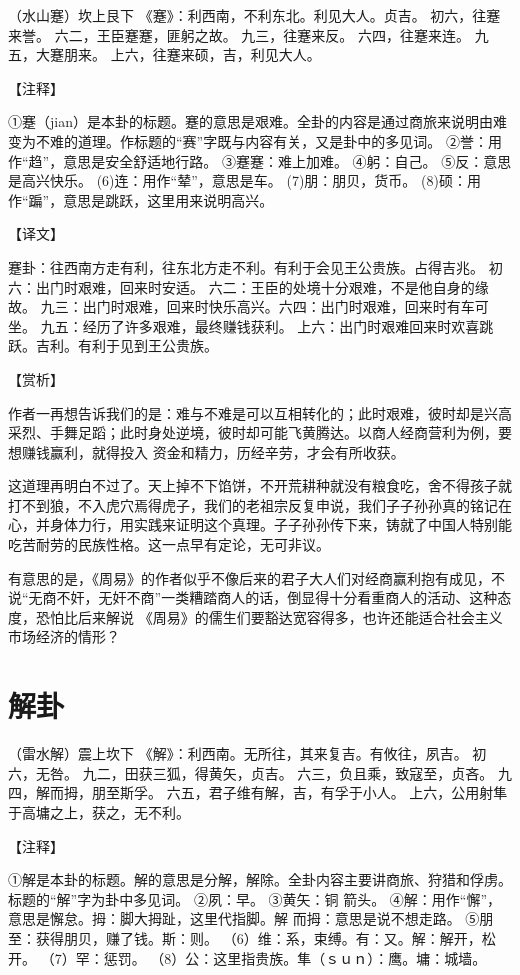 \documentclass[a4paper,12pt,UTF8,twoside]{ctexbook}
\begin{document}
（水山蹇）坎上艮下
《蹇》：利西南，不利东北。利见大人。贞吉。
初六，往蹇来誉。
六二，王臣蹇蹇，匪躬之故。
九三，往蹇来反。
六四，往蹇来连。
九五，大蹇朋来。
上六，往蹇来硕，吉，利见大人。

【注释】

①蹇（jian）是本卦的标题。蹇的意思是艰难。全卦的内容是通过商旅来说明由难变为不难的道理。作标题的“赛”字既与内容有关，又是卦中的多见词。
②誉：用作“趋”，意思是安全舒适地行路。
③蹇蹇：难上加难。
④躬：自己。
⑤反：意思是高兴快乐。
(6)连：用作“辇”，意思是车。
(7)朋：朋贝，货币。
(8)硕：用作“蹁”，意思是跳跃，这里用来说明高兴。

【译文】

蹇卦：往西南方走有利，往东北方走不利。有利于会见王公贵族。占得吉兆。
初六：出门时艰难，回来时安适。
六二：王臣的处境十分艰难，不是他自身的缘故。
九三：出门时艰难，回来时快乐高兴。六四：出门时艰难，回来时有车可坐。
九五：经历了许多艰难，最终赚钱获利。
上六：出门时艰难回来时欢喜跳跃。吉利。有利于见到王公贵族。

【赏析】

作者一再想告诉我们的是：难与不难是可以互相转化的；此时艰难，彼时却是兴高采烈、手舞足蹈；此时身处逆境，彼时却可能飞黄腾达。以商人经商营利为例，要想赚钱赢利，就得投入 资金和精力，历经辛劳，才会有所收获。

这道理再明白不过了。天上掉不下馅饼，不开荒耕种就没有粮食吃，舍不得孩子就打不到狼，不入虎穴焉得虎子，我们的老祖宗反复申说，我们子子孙孙真的铭记在心，并身体力行，用实践来证明这个真理。子子孙孙传下来，铸就了中国人特别能吃苦耐劳的民族性格。这一点早有定论，无可非议。

有意思的是，《周易》的作者似乎不像后来的君子大人们对经商赢利抱有成见，不说“无商不奸，无奸不商”一类糟踏商人的话，倒显得十分看重商人的活动、这种态度，恐怕比后来解说 《周易》的儒生们要豁达宽容得多，也许还能适合社会主义市场经济的情形？

\chapter{解卦}

（雷水解）震上坎下
《解》：利西南。无所往，其来复吉。有攸往，夙吉。
初六，无咎。
九二，田获三狐，得黄矢，贞吉。
六三，负且乘，致寇至，贞吝。
九四，解而拇，朋至斯孚。
六五，君子维有解，吉，有孚于小人。
上六，公用射隼于高墉之上，获之，无不利。

【注释】

①解是本卦的标题。解的意思是分解，解除。全卦内容主要讲商旅、狩猎和俘虏。标题的“解”字为卦中多见词。
②夙：早。
③黄矢：铜 箭头。
④解：用作“懈”，意思是懈怠。拇：脚大拇趾，这里代指脚。解 而拇：意思是说不想走路。
⑤朋至：获得朋贝，赚了钱。斯：则。
（6）维：系，束缚。有：又。解：解开，松开。
（7）罕：惩罚。
（8）公：这里指贵族。隼（ｓｕｎ）：鹰。墉：城墙。
\end{document}
